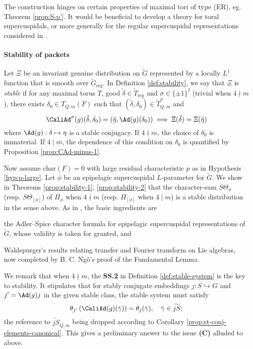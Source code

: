 \documentclass[a4paper,10pt]{article}
\begin{document}
The construction hinges on certain properties of maximal tori of type (ER), eg. Theorem \ref{prop:S-p'}. It would be beneficial to develop a theory for toral supercuspidals, or more generally for the regular supercuspidal representations considered in \cite{Kal16}.

\paragraph*{Stability of packets}
Let $\Xi$ be an invariant genuine distribution on $\tilde{G}$ represented by a locally $L^1$ function that is smooth over $\tilde{G}_{\mathrm{reg}}$. In Definition \ref{def:stability}, we say that $\Xi$ is \emph{stable} if for any maximal torus $T$, good $\tilde{\delta} \in \tilde{T}_{\mathrm{reg}}$ and $\sigma \in \{\pm 1\}^I$ (trivial when $4 \nmid m$), there exists $\delta_0 \in T_{Q,m}(F)$ such that $(\tilde{\delta}, \delta_0) \in \tilde{T}^\sigma_{Q,m}$ and
\[ \CaliAd^\sigma(g)(\tilde{\delta}, \delta_0) = \left( \tilde{\eta}, \Ad(g)(\delta_0)\right) \implies \Xi(\tilde{\delta}) = \Xi(\tilde{\eta}) \]
where $\Ad(g): \delta \mapsto \eta$ is a stable conjugacy. If $4 \nmid m$, the choice of $\delta_0$ is immaterial. If $4 \mid m$, the dependence of this condition on $\delta_0$ is quantified by Proposition \ref{prop:CAd-minus-1}.

Now assume $\text{char}(F)=0$ with large residual characteristic $p$ as in Hypothesis \ref{hyp:p-large}. Let $\phi$ be an epipelagic supercuspidal $L$-parameter for $\tilde{G}$. We show in Theorems \ref{prop:stability-1}, \ref{prop:stability-2} that the character-sum $S\Theta_\phi$ (resp. $S\Theta_{[\phi]}$) of $\Pi_\phi$ when $4 \nmid m$ (resp. $\Pi_{[\phi]}$ when $4 \mid m$) is a stable distribution in the sense above. As in \cite{Kal15}, the basic ingredients are
\begin{inparaenum}[(a)]
	\item the Adler--Spice character formula \cite{AS09} for epipelagic supercuspidal representations of $\tilde{G}$, whose validity is taken for granted, and
	\item Waldspurger's results \cite{Wa97} relating transfer and Fourier transform on Lie algebras, now completed by B.\! C.\! Ngô's proof of the Fundamental Lemma.
\end{inparaenum}

We remark that when $4 \nmid m$, the \textbf{SS.2} in Definition \ref{def:stable-system} is the key to stability. It stipulates that for stably conjugate embeddings $j: S \hookrightarrow G$ and $j' = \Ad(g)j$ in the given stable class, the stable system must satisfy
\[ \theta_{j'}\left( \CaliAd(g)(\tilde{\gamma}) \right) = \theta_j(\tilde{\gamma}), \quad \tilde{\gamma} \in \widetilde{jS}; \]
the reference to $\widetilde{jS}_{Q,m}$ being dropped according to Corollary \ref{prop:st-conj-elements-canonical}. This gives a preliminary answer to the issue \textbf{(C)} alluded to above.
\end{document}
